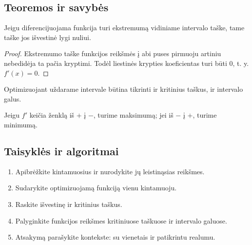 \subsection{Teoremos ir savybės}
\begin{teorema}
Jeigu diferencijuojama funkcija turi ekstremumą vidiniame intervalo taške, tame taške jos išvestinė lygi nuliui.
\end{teorema}
\begin{proof}
Ekstremumo taške funkcijos reikšmės į abi puses pirmuoju artiniu nebedidėja ta pačia kryptimi. Todėl liestinės krypties koeficientas turi būti \(0\), t. y. \(f'(x)=0\).
\end{proof}
\begin{savybe}
Optimizuojant uždarame intervale būtina tikrinti ir kritinius taškus, ir intervalo galus.
\end{savybe}
\begin{savybe}
Jeigu \(f'\) keičia ženklą iš \(+\) į \(-\), turime maksimumą; jei iš \(-\) į \(+\), turime minimumą.
\end{savybe}

\subsection{Taisyklės ir algoritmai}
\begin{enumerate}[label=\arabic*.]
\item Apibrėžkite kintamuosius ir nurodykite jų leistinąsias reikšmes.
\item Sudarykite optimizuojamą funkciją vienu kintamuoju.
\item Raskite išvestinę ir kritinius taškus.
\item Palyginkite funkcijos reikšmes kritiniuose taškuose ir intervalo galuose.
\item Atsakymą parašykite kontekste: su vienetais ir patikrintu realumu.
\end{enumerate}

